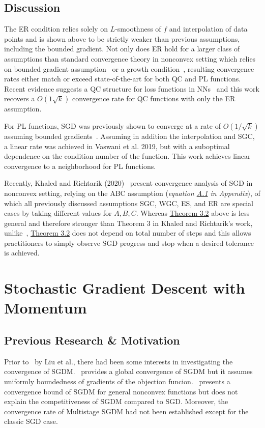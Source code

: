 \documentclass{article}
\begin{document}
\subsection{Discussion}

The ER condition relies solely on $L$-smoothness of $f$ and interpolation of data points and is shown above to be strictly weaker than previous assumptions, including the bounded gradient. Not only does ER hold for a larger class of assumptions than standard convergence theory in nonconvex setting which relies on bounded gradient assumption~\cite{https://doi.org/10.48550/arxiv.1106.5730, JMLR:v15:hazan14a, Rakhlin2012MakingGD} or a growth condition~\cite{Bertsekas1995NeurodynamicPA, https://doi.org/10.48550/arxiv.1606.04838, Schmidt2017MinimizingFS},
resulting convergence rates either match or exceed state-of-the-art for both QC and PL functions.
Recent evidence suggests a QC structure for loss functions in NNs~\cite{Zhou2019SGDCT} and this work recovers a $O(1\sqrt{k})$ convergence rate for QC functions with only the ER assumption.

For PL functions, SGD was previously shown to converge at a rate of $O(1/\sqrt{k})$ assuming bounded gradients~\cite{Karimi2016LinearCO}. Assuming in addition the interpolation and SGC, a linear rate was achieved in Vaswani et al. 2019, but with a suboptimal dependence on the condition number
of the function. This work achieves linear convergence to a neighborhood for PL functions.

Recently, Khaled and Richtarik (2020)~\cite{https://doi.org/10.48550/arxiv.2002.03329} present convergence analysis of SGD in nonconvex setting, relying on the ABC assumption (\textit{equation \hyperref[eqa1]{A.1} in Appendix}),
of which all previously discussed assumptions SGC, WGC, ES, and ER are special cases by taking different values for $A,B,C$. Whereas
\hyperref[them32]{Theorem 3.2} above is less general and therefore stronger than Theorem 3 in Khaled and Richtarik's work, unlike~\cite{https://doi.org/10.48550/arxiv.2002.03329}, \hyperref[them32]{Theorem 3.2} does not depend on total number of steps and this allows practitioners to simply
observe SGD progress and stop when a desired tolerance is achieved.

\section{Stochastic Gradient Descent with Momentum}
\label{section4}
\subsection{Previous Research \& Motivation}
\setcounter{equation}{0}
Prior to~\cite{NEURIPS2020_d3f5d4de} by Liu et al., there had been some interests in investigating the convergence of SGDM.~\cite{https://doi.org/10.48550/arxiv.1905.03817} provides a global convergence of SGDM but it assumes uniformly boundedness of gradients of the objection funcion.~\cite{https://doi.org/10.48550/arxiv.1808.10396} presents a convergence bound of SGDM for general nonconvex functions but does not explain the competitiveness of SGDM compared to SGD.
Moreover, the convergence rate of Multistage SGDM had not been established except for the classic SGD case.
\end{document}
